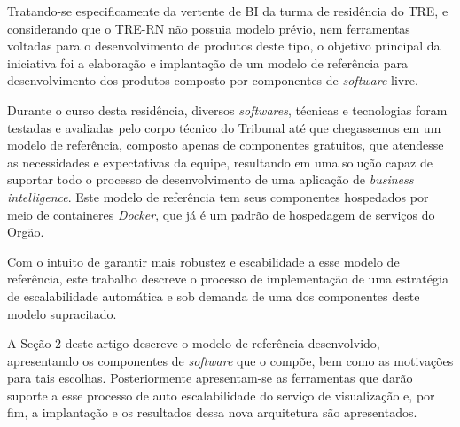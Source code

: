 Tratando-se especificamente da vertente de BI da turma de residência do TRE, e considerando que o TRE-RN não possuia modelo prévio, nem ferramentas voltadas para o desenvolvimento de produtos deste tipo, o objetivo principal da iniciativa foi a elaboração e implantação de um modelo de referência para desenvolvimento dos produtos composto por componentes de \textit{software} livre. 

Durante o curso desta residência, diversos \textit{softwares}, técnicas e tecnologias foram testadas e avaliadas pelo corpo técnico do Tribunal até que chegassemos em um modelo de referência, composto apenas de componentes gratuitos, que atendesse as necessidades e expectativas da equipe, resultando em uma solução capaz de suportar todo o processo de desenvolvimento de uma aplicação de \textit{business intelligence}. Este modelo de referência tem seus componentes hospedados por meio de containeres \textit{Docker}, que já é um padrão de hospedagem de serviços do Orgão.

Com o intuito de garantir mais robustez e escabilidade a esse modelo de referência, este trabalho descreve o processo de implementação de uma estratégia de escalabilidade automática e sob demanda de uma dos componentes deste modelo supracitado.  

A Seção 2 deste artigo descreve o modelo de referência desenvolvido, apresentando os componentes de \textit{software} que o compõe, bem como as motivações para tais escolhas. Posteriormente apresentam-se as ferramentas que darão suporte a esse processo de auto escalabilidade do serviço de visualização e, por fim, a implantação e os resultados dessa nova arquitetura são apresentados.